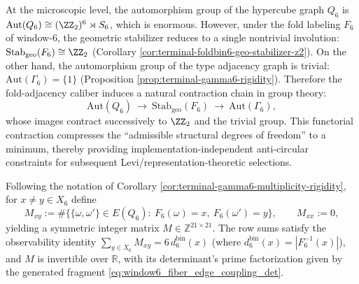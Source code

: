 \begin{remark}\label{rem:terminal-window6-symmetry-breaking-functor}
At the microscopic level, the automorphism group of the hypercube graph \(Q_6\) is \(\mathrm{Aut}(Q_6)\cong(\ZZ_2)^6\rtimes S_6\), which is enormous.
However, under the fold labeling \(F_6\) of window-\(6\), the geometric stabilizer reduces to a single nontrivial involution:
\(\mathrm{Stab}_{\mathrm{geo}}(F_6)\cong \ZZ_2\) (Corollary \ref{cor:terminal-foldbin6-geo-stabilizer-z2}).
On the other hand, the automorphism group of the type adjacency graph is trivial: \(\mathrm{Aut}(\Gamma_6)=\{1\}\) (Proposition \ref{prop:terminal-gamma6-rigidity}).
Therefore the fold-adjacency caliber induces a natural contraction chain in group theory:
\[
\mathrm{Aut}(Q_6)\ \longrightarrow\ \mathrm{Stab}_{\mathrm{geo}}(F_6)\ \longrightarrow\ \mathrm{Aut}(\Gamma_6),
\]
whose images contract successively to \(\ZZ_2\) and the trivial group.
This functorial contraction compresses the ``admissible structural degrees of freedom'' to a minimum, thereby providing implementation-independent anti-circular constraints for subsequent Levi/representation-theoretic selections.
\end{remark}

\begin{theorem}\label{thm:terminal-window6-fiber-edge-coupling-det}
Following the notation of Corollary \ref{cor:terminal-gamma6-multiplicity-rigidity}, for \(x\neq y\in X_6\) define
\[
M_{xy}:=\#\bigl\{\{\omega,\omega'\}\in E(Q_6):\ F_6(\omega)=x,\ F_6(\omega')=y\bigr\},
\qquad
M_{xx}:=0,
\]
yielding a symmetric integer matrix \(M\in\mathbb{Z}^{21\times 21}\).
The row sums satisfy the observability identity
\(
\sum_{y\in X_6}M_{xy}=6\,d^{\mathrm{bin}}_6(x)
\)
(where \(d^{\mathrm{bin}}_6(x)=|F_6^{-1}(x)|\)), and \(M\) is invertible over \(\mathbb{R}\), with its determinant's prime factorization given by the generated fragment \eqref{eq:window6_fiber_edge_coupling_det}.
\end{theorem}


